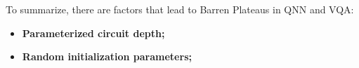 To summarize, there are factors that lead to Barren Plateaus in QNN and VQA:
\begin{itemize}
    \item \textbf{Parameterized circuit depth;}
    \item \textbf{Random initialization parameters;}
\end{itemize}